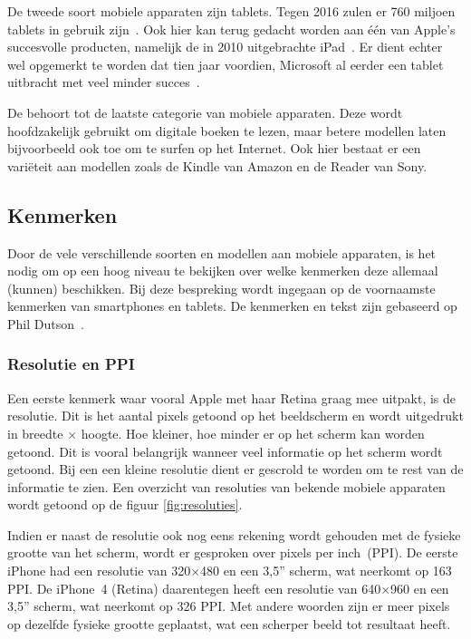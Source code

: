 De tweede soort mobiele apparaten zijn tablets.
Tegen 2016 zulen er 760 miljoen tablets in gebruik zijn~\cite{Gillett2012}.
Ook hier kan terug gedacht worden aan één van Apple's succesvolle producten, namelijk de in 2010 uitgebrachte iPad~\cite{Apple2010}. 
Er dient echter wel opgemerkt te worden dat tien jaar voordien, Microsoft al eerder een tablet uitbracht met veel minder succes~\cite{Microsoft2000}.

De  behoort tot de laatste categorie van mobiele apparaten. 
Deze wordt hoofdzakelijk gebruikt om digitale boeken te lezen, maar betere modellen laten bijvoorbeeld ook toe om te surfen op het Internet. 
Ook hier bestaat er een variëteit aan modellen zoals de Kindle van Amazon en de Reader van Sony.

\subsection{Kenmerken}
Door de vele verschillende soorten en modellen aan mobiele apparaten, is het nodig om op een hoog niveau te bekijken over welke kenmerken deze allemaal (kunnen) beschikken. 
Bij deze bespreking wordt ingegaan op de voornaamste kenmerken van smartphones en tablets. 
De kenmerken en tekst zijn gebaseerd op Phil Dutson~\cite{PhilDutson2012}.

\subsubsection{Resolutie en PPI}
Een eerste kenmerk waar vooral Apple met haar Retina graag mee uitpakt, is de resolutie. 
Dit is het aantal pixels getoond op het beeldscherm en wordt uitgedrukt in breedte $\times$ hoogte. 
Hoe kleiner, hoe minder er op het scherm kan worden getoond. 
Dit is vooral belangrijk wanneer veel informatie op het scherm wordt getoond. 
Bij een een kleine resolutie dient er gescrold te worden om te rest van de informatie te zien.
Een overzicht van resoluties van bekende mobiele apparaten wordt getoond op de figuur \ref{fig:resoluties}.

Indien er naast de resolutie ook nog eens rekening wordt gehouden met de fysieke grootte van het scherm, wordt er gesproken over pixels per inch~(PPI). 
De eerste iPhone had een resolutie van 320$\times$480 en een 3,5” scherm, wat neerkomt op 163 PPI. 
De iPhone~4 (Retina) daarentegen heeft een resolutie van 640$\times$960 en een 3,5” scherm, wat neerkomt op 326 PPI. 
Met andere woorden zijn er meer pixels op dezelfde fysieke grootte geplaatst, wat een scherper beeld tot resultaat heeft. 

